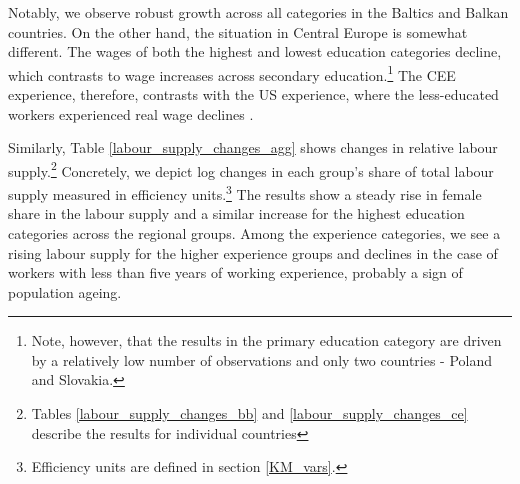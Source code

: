 \documentclass[11pt]{article}
\begin{document}
Notably, we observe robust growth across all categories in the Baltics and Balkan countries. On the other hand, the situation in Central Europe is somewhat different. The wages of both the highest and lowest education categories decline, which contrasts to wage increases across secondary education.\footnote{Note, however, that the results in the primary education category are driven by a relatively low number of observations and only two countries - Poland and Slovakia.} The CEE experience, therefore, contrasts with the US experience, where the less-educated workers experienced real wage declines \citep{acemoglu2011skills}.

Similarly, Table \ref{labour_supply_changes_agg} shows changes in relative labour supply.\footnote{Tables \ref{labour_supply_changes_bb} and \ref{labour_supply_changes_ce} describe the results for individual countries} Concretely, we depict log changes in each group's share of total labour supply measured in efficiency units.\footnote{Efficiency units are defined in section \ref{KM_vars}.} The results show a steady rise in female share in the labour supply and a similar increase for the highest education categories across the regional groups. Among the experience categories, we see a rising labour supply for the higher experience groups and declines in the case of workers with less than five years of working experience, probably a sign of population ageing.
\end{document}
